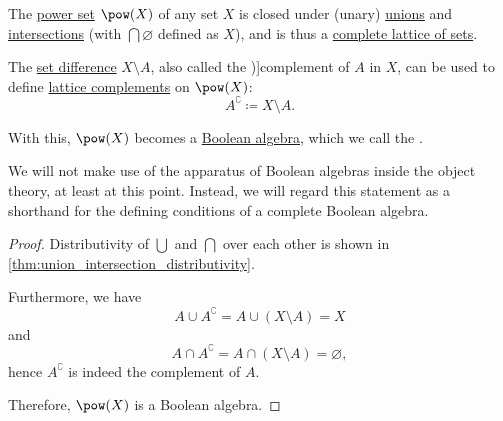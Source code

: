 \begin{definition}\label{def:power_set_algebra}
  The \hyperref[def:power_set]{power set} \( \pow(X) \) of any set \( X \) is closed under (unary) \hyperref[def:set_union/unary]{unions} and \hyperref[def:set_intersection/unary]{intersections} (with \( \bigcap \varnothing \) defined as \( X \)), and is thus a \hyperref[def:lattice_of_sets]{complete lattice of sets}.

  The \hyperref[def:set_difference]{set difference} \( X \setminus A \), also called the \term[en=complement (\cite[13]{Willard2004GeneralTopology})]{complement} of \( A \) in \( X \), can be used to define \hyperref[def:bounded_lattice_complement]{lattice complements} on \( \pow(X) \):
  \begin{equation*}
    A^\complement \coloneqq X \setminus A.
  \end{equation*}

  With this, \( \pow(X) \) becomes a \hyperref[def:boolean_algebra]{Boolean algebra}, which we call the .
\end{definition}
\begin{comments}
  \item We will not make use of the apparatus of Boolean algebras inside the object theory, at least at this point. Instead, we will regard this statement as a shorthand for the defining conditions of a complete Boolean algebra.
\end{comments}
\begin{proof}
  Distributivity of \( \bigcup \) and \( \bigcap \) over each other is shown in \cref{thm:union_intersection_distributivity}.

  Furthermore, we have
  \begin{equation*}
    A \cup A^\complement
    =
    A \cup (X \setminus A)
    =
    X
  \end{equation*}
  and
  \begin{equation*}
    A \cap A^\complement
    =
    A \cap (X \setminus A)
    =
    \varnothing,
  \end{equation*}
  hence \( A^\complement \) is indeed the complement of \( A \).

  Therefore, \( \pow(X) \) is a Boolean algebra.
\end{proof}


